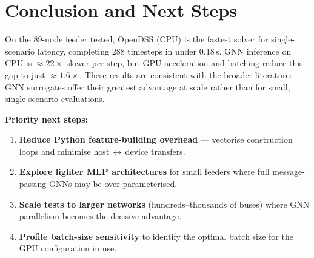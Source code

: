 \documentclass[11pt]{article}
\begin{document}
\section{Conclusion and Next Steps}

On the 89-node feeder tested, OpenDSS (CPU) is the fastest solver for single-scenario
latency, completing 288 timesteps in under 0.18\,s.  GNN inference on CPU is
${\approx}22\times$ slower per step, but GPU acceleration and batching reduce this gap
to just ${\approx}1.6\times$.  These results are consistent with the broader literature:
GNN surrogates offer their greatest advantage at scale rather than for small,
single-scenario evaluations.

\medskip
\noindent\textbf{Priority next steps:}
\begin{enumerate}[itemsep=3pt]
  \item \textbf{Reduce Python feature-building overhead} --- vectorise construction loops
        and minimise host\,$\leftrightarrow$\,device transfers.
  \item \textbf{Explore lighter MLP architectures} for small feeders where full
        message-passing GNNs may be over-parameterised.
  \item \textbf{Scale tests to larger networks} (hundreds--thousands of buses) where GNN
        parallelism becomes the decisive advantage.
  \item \textbf{Profile batch-size sensitivity} to identify the optimal batch size for
        the GPU configuration in use.
\end{enumerate}
\end{document}
